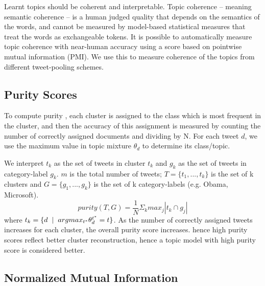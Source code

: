 \documentclass[10pt,a5paper,twoside]{article}
\begin{document}
Learnt topics should be coherent and interpretable.  Topic coherence –
meaning semantic coherence – is a human judged quality that depends on
the semantics of the words, and cannot be measured by model-based
statistical measures that treat the words as exchangeable tokens.  It
is possible to automatically measure topic coherence with near-human
accuracy \cite{baldwin10} using a score based on pointwise mutual
information (PMI).  We use this to measure coherence of the topics
from different tweet-pooling schemes.

\subsection{Purity Scores}

To compute purity \cite{MRS08}, each cluster is assigned to the class
which is most frequent in the cluster, and then the accuracy of this
assignment is measured by counting the number of correctly assigned
documents and dividing by N. For each tweet $d$, we use the maximum
value in topic mixture $\theta_{d} $ to determine its class/topic.

We interpret $t_{k}$ as the set of tweets in cluster $t_{k}$ and
$g_{k}$ as the set of tweets in category-label $g_{k}$. $m$ is the
total number of tweets; $T = \lbrace t_{1}, ... , t_{k} \rbrace$ is
the set of k clusters and $ G = \lbrace g_{1}, ... , g_{k}\rbrace $ is
the set of k category-labels (e.g. Obama, Microsoft).\vspace{-3pt}
\[
 purity (T,G) = \frac{1}{N} \Sigma_{k} max_{j} |t_{k} \cap g_{j}|
\]
where $ t_k = \lbrace  d \hspace{2 mm} |  \hspace{2 mm} argmax_{t^*} \theta^{t^{*}}_d = t \rbrace $.
As the number of correctly assigned tweets increases for each cluster,
the overall purity score increases. hence high purity scores reflect
better cluster reconstruction, hence a topic model with high purity
score is considered better.

\subsection{Normalized Mutual Information}
\end{document}
